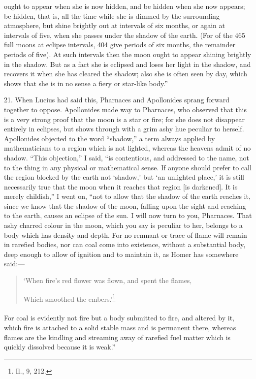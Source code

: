 \documentclass[a4paper, 11pt, oneside, polutonikogreek, english]{article}
\begin{document}
ought to appear when she is now hidden, and be hidden when she now appears; be hidden, that is, all the time while she is dimmed by the surrounding atmosphere, but shine brightly out at intervals of six months, or again at intervals of five, when she passes under the shadow of the earth. (For of the 465 full moons at eclipse intervals, 404 give periods of six months, the remainder periods of five). At such intervals then the moon ought to appear shining brightly in the shadow. But as a fact she is eclipsed and loses her light in the shadow, and recovers it when she has cleared the shadow; also she is often seen by day, which shows that she is in no sense a fiery or star-like body.''

21. When Lucius had said this, Pharnaces and Apollonides sprang forward together to oppose. Apollonides made way to Pharnaces, who observed that this is a very strong proof that the moon is a star or fire; for she does not disappear entirely in eclipses, but shows through with a grim ashy hue peculiar to herself. Apollonides objected to the word ``shadow,'' a term always applied by mathematicians to a region which is not lighted, whereas the heavens admit of no shadow. ``This objection,'' I said, ``is contentious, and addressed to the name, not to the thing in any physical or mathematical sense. If anyone should prefer to call the region blocked by the earth not `shadow,' but `an unlighted place,' it is still necessarily true that the moon when it reaches that region [is darkened]. It is merely childish,'' I went on, ``not to allow that the shadow of the earth reaches it, since we know that the shadow of the moon, falling upon the sight and reaching to the earth, causes an eclipse of the sun. I will now turn to you, Pharnaces. That ashy charred colour in the moon, which you say is peculiar to her, belongs to a body which has density and depth. For no remnant or trace of flame will remain in rarefied bodies, nor can coal come into existence, without a substantial body, deep enough to allow of ignition and to maintain it, as Homer has somewhere said:--- 
\begin{quotation}
`When fire's red flower was flown, and spent the flames,

Which smoothed the embers.'\footnote{Il., 9, 212.}
\end{quotation}
\paragraph{}
For coal is evidently not fire but a body submitted to fire, and altered by it, which fire is attached to a solid stable mass and is permanent there, whereas flames are the kindling and streaming away of rarefied fuel matter which is quickly dissolved because it is weak.''
\end{document}

